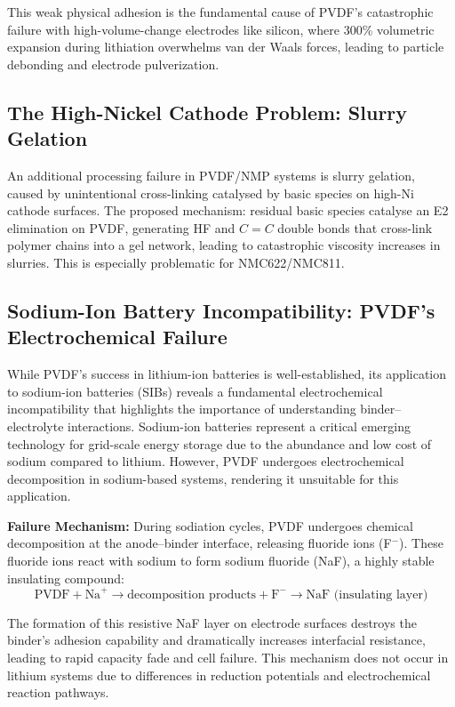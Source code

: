 \documentclass[12pt,a4paper]{article}
\begin{document}
This weak physical adhesion is the fundamental cause of PVDF's catastrophic failure with high-volume-change electrodes like silicon, where 300\% volumetric expansion during lithiation overwhelms van der Waals forces, leading to particle debonding and electrode pulverization.

\subsection{The High-Nickel Cathode Problem: Slurry Gelation}

An additional processing failure in PVDF/NMP systems is slurry gelation, caused by unintentional cross-linking catalysed by basic species on high-Ni cathode surfaces. The proposed mechanism: residual basic species catalyse an E2 elimination on PVDF, generating HF and $C=C$ double bonds that cross-link polymer chains into a gel network, leading to catastrophic viscosity increases in slurries. This is especially problematic for NMC622/NMC811.\citep{ref1}

\subsection{Sodium-Ion Battery Incompatibility: PVDF's Electrochemical Failure}

While PVDF's success in lithium-ion batteries is well-established, its application to sodium-ion batteries (SIBs) reveals a fundamental electrochemical incompatibility that highlights the importance of understanding binder--electrolyte interactions. Sodium-ion batteries represent a critical emerging technology for grid-scale energy storage due to the abundance and low cost of sodium compared to lithium. However, PVDF undergoes electrochemical decomposition in sodium-based systems, rendering it unsuitable for this application.\citep{ref50}

\textbf{Failure Mechanism:} During sodiation cycles, PVDF undergoes chemical decomposition at the anode--binder interface, releasing fluoride ions (F$^-$). These fluoride ions react with sodium to form sodium fluoride (NaF), a highly stable insulating compound:
\begin{equation}
  \text{PVDF} + \text{Na}^+ \rightarrow \text{decomposition products} + \text{F}^- \rightarrow \text{NaF (insulating layer)}
\end{equation}

The formation of this resistive NaF layer on electrode surfaces destroys the binder's adhesion capability and dramatically increases interfacial resistance, leading to rapid capacity fade and cell failure. This mechanism does not occur in lithium systems due to differences in reduction potentials and electrochemical reaction pathways.
\end{document}
